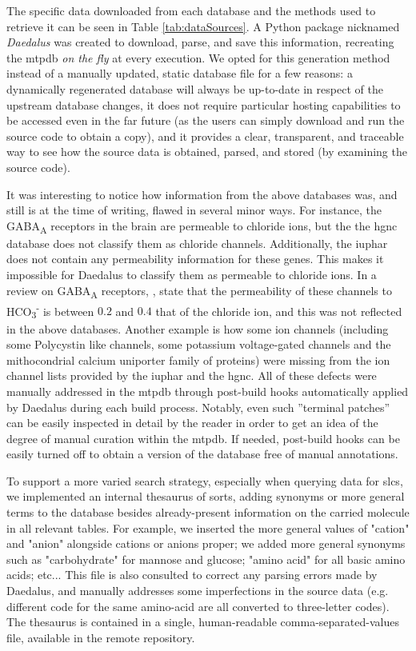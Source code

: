 The specific data downloaded from each database and the methods used to retrieve it can be seen in Table \ref{tab:dataSources}. A Python package nicknamed \textit{Daedalus} was created to download, parse, and save this information, recreating the \gls{mtpdb} \textit{on the fly} at every execution. We opted for this generation method instead of a manually updated, static database file for a few reasons: a dynamically regenerated database will always be up-to-date in respect of the upstream database changes, it does not require particular hosting capabilities to be accessed even in the far future (as the users can simply download and run the source code to obtain a copy), and it provides a clear, transparent, and traceable way to see how the source data is obtained, parsed, and stored (by examining the source code).

It was interesting to notice how information from the above databases was, and still is at the time of writing, flawed in several minor ways. For instance, the GABA\textsubscript{A} receptors in the brain are permeable to chloride ions, but the the \gls{hgnc} database does not classify them as chloride channels. Additionally, the \gls{iuphar} does not contain any permeability information for these genes. This makes it impossible for Daedalus to classify them as permeable to chloride ions.
In a review on GABA\textsubscript{A} receptors, \textcite{goetzGABAAReceptors2007}, state that the permeability of these channels to HCO\textsubscript{3}\textsuperscript{-} is between $0.2$ and $0.4$ that of the chloride ion, and this was not reflected in the above databases. 
Another example is how some ion channels (including some Polycystin like channels, some potassium voltage-gated channels and the mithocondrial calcium uniporter family of proteins) were missing from the ion channel lists provided by the \gls{iuphar} and the \gls{hgnc}.
All of these defects were manually addressed in the \gls{mtpdb} through post-build hooks automatically applied by Daedalus during each build process.
Notably, even such ''terminal patches'' can be easily inspected in detail by the reader in order to get an idea of the degree of manual curation within the \gls{mtpdb}. If needed, post-build hooks can be easily turned off to obtain a version of the database free of manual annotations.

To support a more varied search strategy, especially when querying data for \glspl{slc}, we implemented an internal thesaurus of sorts, adding synonyms or more general terms to the database besides already-present information on the carried molecule in all relevant tables. For example, we inserted the more general values of "cation" and "anion" alongside cations or anions proper; we added more general synonyms such as "carbohydrate" for mannose and glucose; "amino acid" for all basic amino acids; etc...
This file is also consulted to correct any parsing errors made by Daedalus, and manually addresses some imperfections in the source data (e.g. different code for the same amino-acid are all converted to three-letter codes).
The thesaurus is contained in a single, human-readable comma-separated-values file, available in the remote repository.

